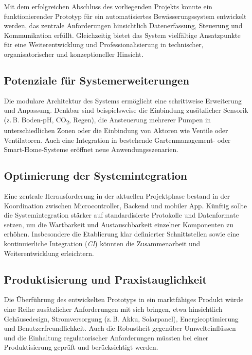 Mit dem erfolgreichen Abschluss des vorliegenden Projekts konnte ein funktionierender Prototyp für ein automatisiertes Bewässerungssystem entwickelt werden, das zentrale Anforderungen hinsichtlich Datenerfassung, Steuerung und Kommunikation erfüllt. Gleichzeitig bietet das System vielfältige Ansatzpunkte für eine Weiterentwicklung und Professionalisierung in technischer, organisatorischer und konzeptioneller Hinsicht.

\subsection*{Potenziale für Systemerweiterungen}

Die modulare Architektur des Systems ermöglicht eine schrittweise Erweiterung und Anpassung. Denkbar sind beispielsweise die Einbindung zusätzlicher Sensorik (z.\,B. Boden-pH, CO\textsubscript{2}, Regen), die Ansteuerung mehrerer Pumpen in unterschiedlichen Zonen oder die Einbindung von Aktoren wie Ventile oder Ventilatoren. Auch eine Integration in bestehende Gartenmanagement- oder Smart-Home-Systeme eröffnet neue Anwendungsszenarien.

\subsection*{Optimierung der Systemintegration}

Eine zentrale Herausforderung in der aktuellen Projektphase bestand in der Koordination zwischen Microcontroller, Backend und mobiler App. Künftig sollte die Systemintegration stärker auf standardisierte Protokolle und Datenformate setzen, um die Wartbarkeit und Austauschbarkeit einzelner Komponenten zu erhöhen. Insbesondere die Etablierung klar definierter Schnittstellen sowie eine kontinuierliche Integration (\textit{CI}) könnten die Zusammenarbeit und Weiterentwicklung erleichtern.

\subsection*{Produktisierung und Praxistauglichkeit}

Die Überführung des entwickelten Prototyps in ein marktfähiges Produkt würde eine Reihe zusätzlicher Anforderungen mit sich bringen, etwa hinsichtlich Gehäusedesign, Stromversorgung (z.\,B. Akku, Solarpanel), Energieoptimierung und Benutzerfreundlichkeit. Auch die Robustheit gegenüber Umwelteinflüssen und die Einhaltung regulatorischer Anforderungen müssten bei einer Produktisierung geprüft und berücksichtigt werden.

